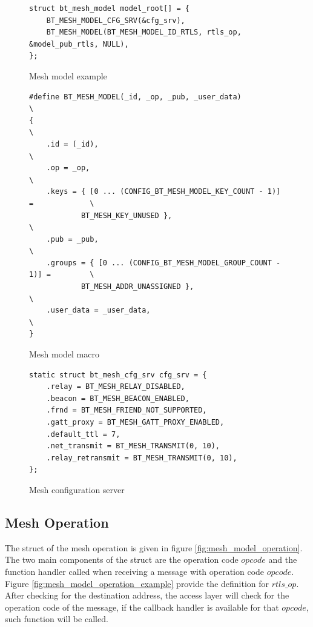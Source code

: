\documentclass[\main/main.tex]{subfiles}
\begin{document}
\begin{figure}[H]
    \begin{lstlisting}[style=CStyle]
struct bt_mesh_model model_root[] = {
    BT_MESH_MODEL_CFG_SRV(&cfg_srv),
    BT_MESH_MODEL(BT_MESH_MODEL_ID_RTLS, rtls_op, &model_pub_rtls, NULL),
};
    \end{lstlisting}
    \caption{Mesh model example}
    \label{fig:mesh_model_example}
\end{figure}

\begin{figure}[H]
    \begin{lstlisting}[style=CStyle]
#define BT_MESH_MODEL(_id, _op, _pub, _user_data)                            \
{                                                                            \
	.id = (_id),                                                         \
	.op = _op,                                                           \
	.keys = { [0 ... (CONFIG_BT_MESH_MODEL_KEY_COUNT - 1)] =             \
			BT_MESH_KEY_UNUSED },                                \
	.pub = _pub,                                                         \
	.groups = { [0 ... (CONFIG_BT_MESH_MODEL_GROUP_COUNT - 1)] =         \
			BT_MESH_ADDR_UNASSIGNED },                           \
	.user_data = _user_data,                                             \
}
\end{lstlisting}
\caption{Mesh model macro}
\label{fig:mesh_model_macro}
\end{figure}

\begin{figure}[H]
    \begin{lstlisting}[style=CStyle]
static struct bt_mesh_cfg_srv cfg_srv = {
    .relay = BT_MESH_RELAY_DISABLED,
    .beacon = BT_MESH_BEACON_ENABLED,
    .frnd = BT_MESH_FRIEND_NOT_SUPPORTED,
    .gatt_proxy = BT_MESH_GATT_PROXY_ENABLED,
    .default_ttl = 7,
    .net_transmit = BT_MESH_TRANSMIT(0, 10),
    .relay_retransmit = BT_MESH_TRANSMIT(0, 10),
};
\end{lstlisting}
\caption{Mesh configuration server}
\label{fig:mesh_configuration_server}
\end{figure}

\subsection{Mesh Operation}
The struct of the mesh operation is given in figure \ref{fig:mesh_model_operation}. The two main components of the struct are the operation code $opcode$ and the function handler called when receiving a message with operation code $opcode$. Figure \ref{fig:mesh_model_operation_example} provide the definition for $rtls\_op$. After checking for the destination address, the access layer will check for the operation code of the message, if the callback handler is available for that $opcode$, such function will be called.
\end{document}
